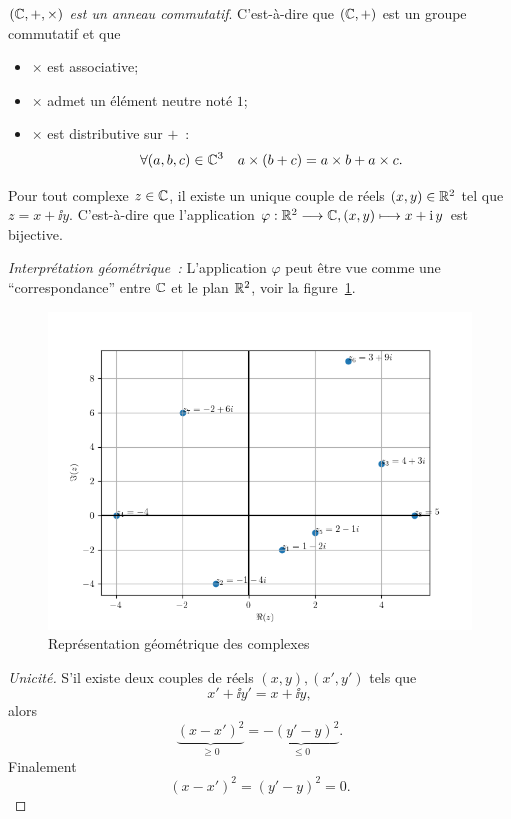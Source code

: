\begin{prop}
    \emph{\((\mathbb{C},+,\times)\) est un anneau commutatif}. C'est-à-dire que 
    \((\mathbb{C},+)\) est un groupe commutatif et que
    \begin{itemize}
        \item \(\times\) est associative;
        \item \(\times\) admet un élément neutre noté \(1\);
        \item \(\times\) est distributive sur \(+\)~:
            \begin{equation}
                \forall (a,b,c) \in \mathbb{C}^3 \quad a \times (b+c)=a \times b+ a 
                \times c.
            \end{equation}
    \end{itemize}
\end{prop}
\begin{prop}
    Pour tout complexe \(z \in \mathbb{C}\), il existe un unique couple de réels \((x,y) 
    \in \mathbb{R}^2\) tel que \(z=x+\ii y\). C'est-à-dire que l'application 
    \(\varphi:\mathbb{R}^2 \longrightarrow \mathbb{C}, (x,y) \longmapsto x+\operatorname{i} y\) est bijective.
\end{prop}
\emph{Interprétation géométrique~:} L'application $\varphi$ peut être vue comme 
une ``correspondance'' entre $\mathbb{C}$ et le plan $\mathbb{R}^2$, voir la 
figure~\ref{fig:complexe}.
\begin{figure}
    \centering
    \includegraphics[scale=0.8]{./Complexes.png}
    \caption{Représentation géométrique des complexes}
    \label{fig:complexe}
\end{figure}
\begin{proof}[Unicité]
    S'il existe deux couples de réels \((x,y),(x',y')\) tels que
    \begin{equation}
        x'+\ii y'=x +\ii y,
    \end{equation}
    alors
    \begin{equation}
        \underbrace{(x-x')^2}_{\geqslant 0}=\underbrace{-(y'-y)^2}_{\leqslant 0}.
    \end{equation}
    Finalement
    \begin{equation}
        (x-x')^2=(y'-y)^2=0.
    \end{equation}
\end{proof}
